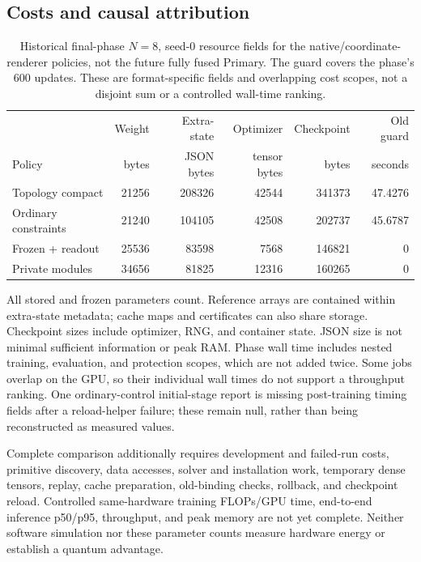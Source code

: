 \subsection{Costs and causal attribution}

\begin{table}[t]
\centering
\small
\begin{tabular}{lrrrrr}
\toprule
 & Weight & Extra-state & Optimizer & Checkpoint & Old guard\\
Policy & bytes & JSON bytes & tensor bytes & bytes & seconds\\
\midrule
Topology compact &21256&208326&42544&341373&47.4276\\
Ordinary constraints &21240&104105&42508&202737&45.6787\\
Frozen + readout &25536&83598&7568&146821&0\\
Private modules &34656&81825&12316&160265&0\\
\bottomrule
\end{tabular}
\caption{Historical final-phase $N=8$, seed-0 resource fields for the
native/coordinate-renderer policies, not the future fully fused Primary.
The guard covers the phase's 600 updates.
These are format-specific fields and overlapping cost scopes, not a disjoint
sum or a controlled wall-time ranking.}
\label{tab:resource-fields}
\end{table}

All stored and frozen parameters count. Reference arrays are contained within
extra-state metadata; cache maps and certificates can also share storage.
Checkpoint sizes include optimizer, RNG, and container state. JSON size is not
minimal sufficient information or peak RAM. Phase wall time includes nested
training, evaluation, and protection scopes, which are not added twice.
Some jobs overlap on the GPU, so their individual wall times do not support a
throughput ranking. One ordinary-control initial-stage report is missing
post-training timing fields after a reload-helper failure; these remain null,
rather than being reconstructed as measured values.

Complete comparison additionally requires development and failed-run costs,
primitive discovery, data accesses, solver and installation work, temporary
dense tensors, replay, cache preparation, old-binding checks, rollback, and
checkpoint reload. Controlled same-hardware training FLOPs/GPU time,
end-to-end inference p50/p95, throughput, and peak memory are not yet complete.
Neither software simulation nor these parameter counts measure hardware energy
or establish a quantum advantage.

